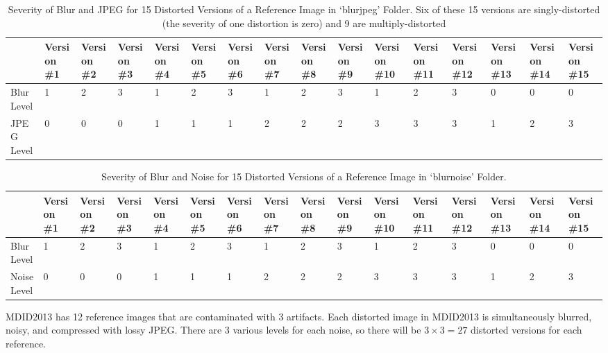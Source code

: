 \begin{sidewaystable}[htb]
    \caption{Severity of Blur and JPEG for 15 Distorted Versions of a Reference Image in `blurjpeg' Folder. Six of these 15 versions are singly-distorted (the severity of one distortion is zero) and 9 are multiply-distorted}
    \label{tbl:blurjpeg}
  \bigskip
    \centering\scriptsize\setlength\tabcolsep{2pt}
        \hspace*{-1cm}\begin{tabular}{m{1cm}|m{1cm}|m{1cm}|m{1cm}|m{1cm}|m{1cm}|m{1cm}|m{1cm}|m{1cm}|m{1cm}|m{1cm}|m{1cm}|m{1cm}|m{1cm}|m{1cm}|m{1cm}}
             &Version \#1&Version \#2&Version \#3&Version \#4&Version \#5&Version \#6&Version \#7&Version \#8&Version \#9&Version \#10&Version \#11&Version \#12&Version \#13&Version \#14&Version \#15 \\
           \hline
              Blur Level& 1&2&3&1&2&3&1&2&3&1&2&3&0&0&0\\
             JPEG Level& 0&0&0&1&1&1&2&2&2&3&3&3&1&2&3\\
        \end{tabular}\hspace*{-1cm}
\end{sidewaystable}

\begin{sidewaystable}[htb]
    \caption{Severity of Blur and Noise for 15 Distorted Versions of a Reference Image in `blurnoise' Folder.}
    \label{tbl:blurnoise}
  \bigskip
    \centering\scriptsize\setlength\tabcolsep{2pt}
        \hspace*{-1cm}\begin{tabular}{m{1cm}|m{1cm}|m{1cm}|m{1cm}|m{1cm}|m{1cm}|m{1cm}|m{1cm}|m{1cm}|m{1cm}|m{1cm}|m{1cm}|m{1cm}|m{1cm}|m{1cm}|m{1cm}}
             &Version \#1&Version \#2&Version \#3&Version \#4&Version \#5&Version \#6&Version \#7&Version \#8&Version \#9&Version \#10&Version \#11&Version \#12&Version \#13&Version \#14&Version \#15 \\
           \hline
              Blur Level& 1&2&3&1&2&3&1&2&3&1&2&3&0&0&0\\
             Noise Level& 0&0&0&1&1&1&2&2&2&3&3&3&1&2&3\\
        \end{tabular}\hspace*{-1cm}
\end{sidewaystable}

MDID2013 has 12 reference images that are contaminated with 3 artifacts. Each distorted image in MDID2013 is simultaneously blurred, noisy, and compressed with lossy JPEG. There are 3 various levels for each noise, so there will be $3\times3=27$ distorted versions for each reference. 

